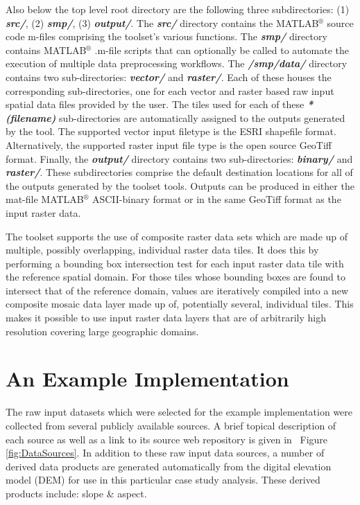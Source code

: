 Also below the top level root directory are the following three subdirectories: (1) \textit{\textbf{src/}}, (2) \textit{\textbf{smp/}}, (3) \textit{\textbf{output/}}. The \textit{\textbf{src/}} directory contains the MATLAB$^{\circledR}$ source code m-files comprising the toolset's various functions. The \textit{\textbf{smp/}} directory contains MATLAB$^{\circledR}$ .m-file scripts that can optionally be called to automate the execution of multiple data preprocessing workflows. The \textit{\textbf{/smp/data/}} directory contains two sub-directories: \textit{\textbf{vector/}} and \textit{\textbf{raster/}}. Each of these houses the corresponding sub-directories, one for each vector and raster based raw input spatial data files provided by the user. The tiles used for each of these \textit{\textbf{*(filename)}} sub-directories are automatically assigned to the outputs generated by the tool. The supported vector input filetype is the ESRI shapefile format. Alternatively, the supported raster input file type is the open source GeoTiff format. Finally, the \textit{\textbf{output/}} directory contains two sub-directories: \textit{\textbf{binary/}} and \textit{\textbf{raster/}}. These subdirectories comprise the default destination locations for all of the outputs generated by the toolset tools. Outputs can be produced in either the mat-file MATLAB$^{\circledR}$ ASCII-binary format or in the same GeoTiff format as the input raster data.

The toolset supports the use of composite raster data sets which are made up of multiple, possibly overlapping, individual raster data tiles. It does this by performing a bounding box intersection test for each input raster data tile with the reference spatial domain. For those tiles whose bounding boxes are found to intersect that of the reference domain, values are iteratively compiled into a new composite mosaic data layer made up of, potentially several, individual tiles. This makes it possible to use input raster data layers that are of arbitrarily high resolution covering large geographic domains.

\section{An Example Implementation}
    
The raw input datasets which were selected for the example implementation were collected from several publicly available sources. A brief topical description of each source as well as a link to its source web repository is given in ~Figure \ref{fig:DataSources}. In addition to these raw input data sources, a number of derived data products are generated automatically from the digital elevation model (DEM) for use in this particular case study analysis. These derived products include: slope \& aspect.

